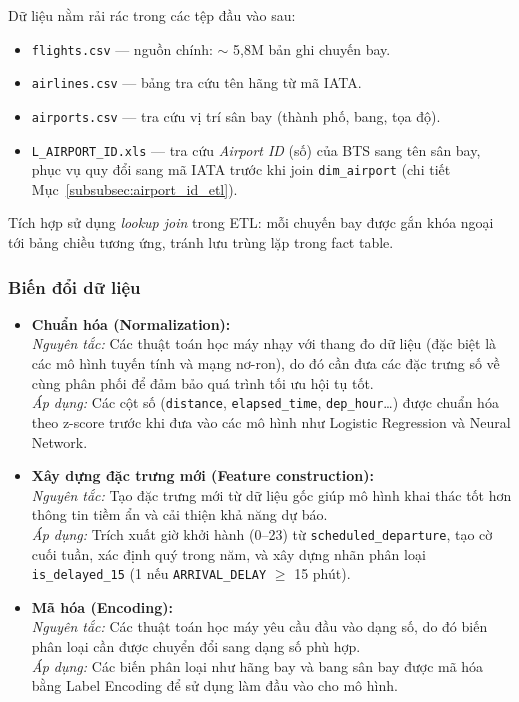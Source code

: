 \noindent Dữ liệu nằm rải rác trong các tệp đầu vào sau:
\begin{itemize}
    \item \texttt{flights.csv} --- nguồn chính: $\sim$ 5{,}8M bản ghi chuyến bay.
    \item \texttt{airlines.csv} --- bảng tra cứu tên hãng từ mã IATA.
    \item \texttt{airports.csv} --- tra cứu vị trí sân bay (thành phố, bang, tọa độ).
    \item \texttt{L\_AIRPORT\_ID.xls} --- tra cứu \textit{Airport ID} (số) của BTS
          sang tên sân bay, phục vụ quy đổi sang mã IATA trước khi join \texttt{dim\_airport}
          (chi tiết Mục~\ref{subsubsec:airport_id_etl}).
\end{itemize}
Tích hợp sử dụng \textit{lookup join} trong ETL:
mỗi chuyến bay được gắn khóa ngoại tới bảng chiều tương ứng,
tránh lưu trùng lặp trong fact table.

\subsubsection{Biến đổi dữ liệu}

\begin{itemize}
    \item \textbf{Chuẩn hóa (Normalization):} \\
    \textit{Nguyên tắc:} Các thuật toán học máy nhạy với thang đo dữ liệu
    (đặc biệt là các mô hình tuyến tính và mạng nơ-ron), do đó cần đưa các
    đặc trưng số về cùng phân phối để đảm bảo quá trình tối ưu hội tụ tốt. \\
    \textit{Áp dụng:} Các cột số (\texttt{distance}, \texttt{elapsed\_time},
    \texttt{dep\_hour}\ldots) được chuẩn hóa theo z-score trước khi đưa vào
    các mô hình như Logistic Regression và Neural Network.

    \item \textbf{Xây dựng đặc trưng mới (Feature construction):} \\
    \textit{Nguyên tắc:} Tạo đặc trưng mới từ dữ liệu gốc giúp mô hình khai thác
    tốt hơn thông tin tiềm ẩn và cải thiện khả năng dự báo. \\
    \textit{Áp dụng:} Trích xuất giờ khởi hành (0--23) từ \texttt{scheduled\_departure},
    tạo cờ cuối tuần, xác định quý trong năm, và xây dựng nhãn phân loại
    \texttt{is\_delayed\_15} (1 nếu \texttt{ARRIVAL\_DELAY} $\geq$ 15 phút).

    \item \textbf{Mã hóa (Encoding):} \\
    \textit{Nguyên tắc:} Các thuật toán học máy yêu cầu đầu vào dạng số,
    do đó biến phân loại cần được chuyển đổi sang dạng số phù hợp. \\
    \textit{Áp dụng:} Các biến phân loại như hãng bay và bang sân bay
    được mã hóa bằng Label Encoding để sử dụng làm đầu vào cho mô hình.
\end{itemize}


